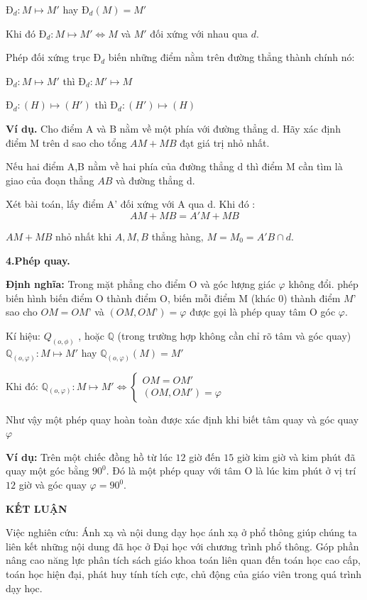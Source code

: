 \documentclass[12pt,oneside,a4paper,reqno]{book}
\begin{document}
$\text{Đ}_d:M\mapsto M' $ hay $\text{Đ}_d(M)=M'$

Khi đó $\text{Đ}_d:M\mapsto M' \Leftrightarrow M$ và $M'$ đối xứng với nhau qua $d$.

Phép đối xứng trục $\text{Đ}_d$ biến những điểm nằm trên đường thẳng thành chính nó:

$\text{Đ}_d:M\mapsto M' $ thì $\text{Đ}_d:M'\mapsto M$

$\text{Đ}_d:(H)\mapsto (H') $ thì $\text{Đ}_d:(H')\mapsto (H)$

\textbf{Ví dụ.} Cho điểm A và B nằm về một phía với đường thẳng d. Hãy xác định điểm M trên d sao cho tổng $AM+MB$ đạt giá trị nhỏ nhất.

Nếu hai điểm A,B nằm về hai phía của đường thẳng d thì điểm M cần tìm là giao của đoạn thẳng $AB$ và đường thẳng d.

Xét bài toán,  lấy điểm A’ đối xứng với A qua d. Khi đó :
                    $$AM+MB=A'M+MB$$

 $AM+MB$ nhỏ nhất khi $A,M,B$ thẳng hàng, $M=M_0=A'B \cap d$.

\textbf{4.Phép quay.}

\textbf{Định nghĩa: }Trong mặt phẳng cho điểm O và góc lượng giác $\varphi$ không đổi.  phép biến hình biến điểm O thành điểm O, biến mỗi điểm M (khác 0) thành điểm $M’$ sao cho $OM=OM’$ và $(OM,OM’)=\varphi$ được gọi là phép quay tâm O góc $\varphi$.

Kí hiệu: $Q_{(o,\phi)}$ , hoặc $\mathbb{Q}$ (trong trường hợp không cần chỉ rõ tâm và góc quay)
$\mathbb{Q}_{(o,\varphi)}:M\mapsto M'$  hay $\mathbb{Q}_{(o,\varphi)}(M)=M'$

Khi đó: $\mathbb{Q}_{(o,\varphi)}: M\mapsto M' \Leftrightarrow \left\{\begin{matrix}
OM=OM'\\ 
(OM,OM')=\varphi
\end{matrix}\right.$

Như vậy một phép quay hoàn toàn được xác định khi biết tâm quay và góc quay $\varphi$

\textbf{Ví dụ:} Trên một chiếc đồng hồ từ lúc $12$ giờ đến $15$ giờ kim giờ và kim phút đã quay một góc bằng $90^0$. Đó là một phép quay với tâm O là lúc kim phút  ở vị trí $12$ giờ và góc quay $\varphi=90^0$.


\newpage
\vspace*{0.2cm}
\centerline{\Large\bf KẾT LUẬN}
\medskip
Việc nghiên cứu: Ánh xạ và nội dung dạy học ánh xạ ở phổ thông giúp chúng ta liên kết những nội dung đã học ở Đại học với chương trình phổ thông. Góp phần nâng cao năng lực phân tích sách giáo khoa toán liên quan đến toán học cao cấp, toán học hiện đại, phát huy tính tích cực, chủ động của giáo viên trong quá trình dạy học.
\end{document}
